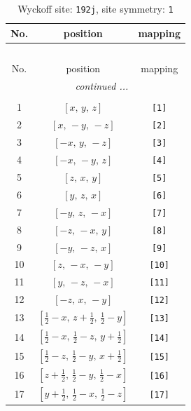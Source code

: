 \documentclass[fleqn,8pt]{jsarticle}
\begin{document}
\begin{longtable}{ccc}
\caption{Wyckoff site: {\tt 192j}, site symmetry: {\tt 1}}
 \\
 \hline \hline
No. & position & mapping \\ \hline \endfirsthead

\multicolumn{2}{l}{\tablename\ \thetable{}} \\
 \hline \hline
No. & position & mapping \\ \hline \endhead

 \hline \hline
\multicolumn{2}{r}{\footnotesize\it continued ...} \\ \endfoot

 \hline \hline
\multicolumn{2}{r}{} \\ \endlastfoot

1 & $\left[ x,\, y,\, z \right]$ & {\tt [1]} \\ \hline
2 & $\left[ x,\, - y,\, - z \right]$ & {\tt [2]} \\ \hline
3 & $\left[ - x,\, y,\, - z \right]$ & {\tt [3]} \\ \hline
4 & $\left[ - x,\, - y,\, z \right]$ & {\tt [4]} \\ \hline
5 & $\left[ z,\, x,\, y \right]$ & {\tt [5]} \\ \hline
6 & $\left[ y,\, z,\, x \right]$ & {\tt [6]} \\ \hline
7 & $\left[ - y,\, z,\, - x \right]$ & {\tt [7]} \\ \hline
8 & $\left[ - z,\, - x,\, y \right]$ & {\tt [8]} \\ \hline
9 & $\left[ - y,\, - z,\, x \right]$ & {\tt [9]} \\ \hline
10 & $\left[ z,\, - x,\, - y \right]$ & {\tt [10]} \\ \hline
11 & $\left[ y,\, - z,\, - x \right]$ & {\tt [11]} \\ \hline
12 & $\left[ - z,\, x,\, - y \right]$ & {\tt [12]} \\ \hline
13 & $\left[ \frac{1}{2} - x,\, z + \frac{1}{2},\, \frac{1}{2} - y \right]$ & {\tt [13]} \\ \hline
14 & $\left[ \frac{1}{2} - x,\, \frac{1}{2} - z,\, y + \frac{1}{2} \right]$ & {\tt [14]} \\ \hline
15 & $\left[ \frac{1}{2} - z,\, \frac{1}{2} - y,\, x + \frac{1}{2} \right]$ & {\tt [15]} \\ \hline
16 & $\left[ z + \frac{1}{2},\, \frac{1}{2} - y,\, \frac{1}{2} - x \right]$ & {\tt [16]} \\ \hline
17 & $\left[ y + \frac{1}{2},\, \frac{1}{2} - x,\, \frac{1}{2} - z \right]$ & {\tt [17]} \\ \hline

\end{longtable}
\end{document}
